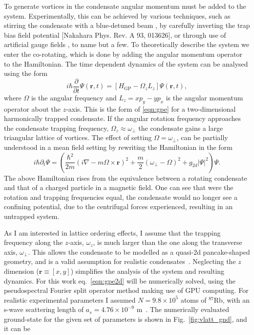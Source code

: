 To generate vortices in the condensate angular momentum must be added to the system. Experimentally, this can be achieved by various techniques, such as stirring the condensate with a blue-detuned beam \cite{Vtx:Raman_prl_2001}, by carefully inverting the trap bias field potential \cite{Vtx:Kawaguchi_pra_2004}[Nakahara Phys. Rev. A 93, 013626], or through use of artificial gauge fields \cite{AO:Dalibard_rmp_2011}, to name but a few. To theoretically describe the system we enter the co-rotating, which is done by adding the angular momentum operator to the Hamiltonian. The time dependent dynamics of the system can be analysed using the form
\begin{equation}\label{eqn:gpe2d}
	i\hbar\frac{\partial}{\partial t}\Psi(\mathbf{r},t) = \left[ H_{\text{GP}}  -  \Omega_z L_z \right] \Psi(\mathbf{r},t),
\end{equation}
where $\Omega$ is the angular frequency and $L_z = xp_y - yp_x$ is the angular momentum operator about the $z$-axis. This is the form of \ref{eqn:gpe} for a two-dimensional harmonically trapped condensate. If the angular rotation frequency approaches the condensate trapping frequency, $\Omega_z \approx \omega_\perp$ the condensate gains a large triangular lattice of vortices.  The effect of setting $\Omega=\omega_\perp$, can be partially understood in a mean field setting by rewriting the Hamiltonian in the form
\begin{equation}
    i\hbar\partial_t \Psi =
    \left(\frac{\hbar^2}{2m}(i\nabla - m\Omega\times\mathbf{r})^2 + \frac{m}{2}(\omega_\perp - \Omega)^2 + g_{2d}|\Psi|^2 \right)\Psi.
\end{equation}
The above Hamiltonian rises from the equivalence between a rotating condensate and that of a charged particle in a magnetic field. One can see that were the rotation and trapping frequencies equal, the condensate would no longer see a confining potential, due to the centrifugal forces experienced, resulting in an untrapped system.

As I am interested in lattice ordering effects, I assume that the trapping frequency along the $z$-axis, $\omega_z$, is much larger than the one along the transverse axis, $\omega_\perp$. This allows the condensate to be modelled as a quasi-2d pancake-shaped geometry, and is a valid assumption for realistic condensates~\cite{BEC:Fetter_revmodphys_2009}. Neglecting the $z$ dimension ($\textbf{r}\equiv [x,y]$) simplifies the analysis of the system and resulting dynamics. For this work eq.~\eqref{eqn:gpe2d} will be numerically solved, using the pseudospectral Fourier split operator method making use of GPU computing\cite{NUMERICS}. For realistic experimental parameters I assumed  $N=9.8\times 10^5$ atoms of $^{87}$Rb, with an s-wave scattering length of $a_s=4.76\times10^{-9}$ m~\cite{AO:Roberts_prl_1998}. The numerically evaluated ground-state for the given set of parameters is shown in Fig.~\ref{fig:vlatt_gnd}, and it can be

